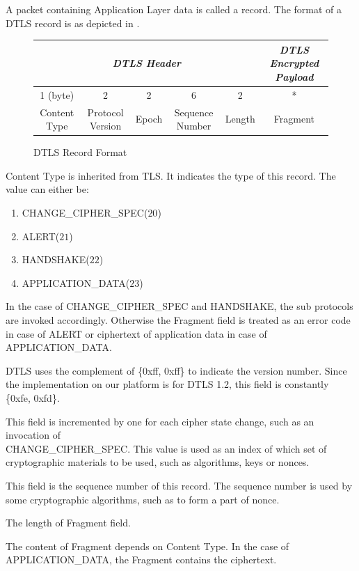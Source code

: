 A packet containing Application Layer data is called a record. The format of a DTLS record is as depicted in .
\begin{figure}[h!]
	\center
	\begin{tabular}{cccccc}
		\multicolumn{5}{c}{\textit{DTLS Header}}                                                                                                                                     & \textit{DTLS Encrypted Payload} \\ \hline
		\multicolumn{1}{|c|}{1 (byte)}     & \multicolumn{1}{c|}{2}                & \multicolumn{1}{c|}{2}     & \multicolumn{1}{c|}{6}               & \multicolumn{1}{c|}{2}      & \multicolumn{1}{c|}{*}          \\ \hline
		\multicolumn{1}{|c|}{Content Type} & \multicolumn{1}{c|}{Protocol Version} & \multicolumn{1}{c|}{Epoch} & \multicolumn{1}{c|}{Sequence Number} & \multicolumn{1}{c|}{Length} & \multicolumn{1}{c|}{Fragment}   \\ \hline
	\end{tabular}
	\caption{DTLS Record Format}
	\label{Fig: DTLS Record Format}
\end{figure}

\begin{description}[style=nextline]
	\item[\textbf{Content Type}]
	Content Type is inherited from TLS. It indicates the type of this record. The value can either be:
	\begin{enumerate}
		\item CHANGE\_CIPHER\_SPEC($20$)
		\item ALERT($21$)
		\item HANDSHAKE($22$)
		\item APPLICATION\_DATA($23$)
	\end{enumerate}
	In the case of CHANGE\_CIPHER\_SPEC and HANDSHAKE, the sub protocols are invoked accordingly. Otherwise the Fragment field is treated as an error code in case of ALERT or ciphertext of application data in case of APPLICATION\_DATA.
	\item[\textbf{Protocol Version}]
	DTLS uses the complement of \{0xff, 0xff\} to indicate the version number. Since the implementation on our platform is for DTLS 1.2, this field is constantly \{0xfe, 0xfd\}.
	\item[\textbf{Epoch}]
	This field is incremented by one for each cipher state change, such as an invocation of \\
	CHANGE\_CIPHER\_SPEC. This value is used as an index of which set of cryptographic materials to be used, such as algorithms, keys or nonces.
	\item[\textbf{Sequence Number}]
	This field is the sequence number of this record. The sequence number is used by some cryptographic algorithms, such as to form a part of nonce.
	\item[\textbf{Length}]
	The length of Fragment field.
	\item[\textbf{Fragment}]
	The content of Fragment depends on Content Type. In the case of APPLICATION\_DATA, the Fragment contains the ciphertext.
\end{description}

